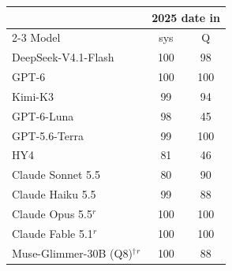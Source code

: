 \begin{tabular}{@{}l cc@{}}
\toprule
 & \multicolumn{2}{c}{2025 date in} \\
\cmidrule(lr){2-3}
Model & sys & Q \\
\midrule
DeepSeek-V4.1-Flash & 100 & 98 \\
GPT-6 & 100 & 100 \\
Kimi-K3 & 99 & 94 \\
GPT-6-Luna & 98 & 45 \\
GPT-5.6-Terra & 99 & 100 \\
HY4 & 81 & 46 \\
Claude Sonnet 5.5 & 80 & 90 \\
Claude Haiku 5.5 & 99 & 88 \\
Claude Opus 5.5$^{r}$ & 100 & 100 \\
Claude Fable 5.1$^{r}$ & 100 & 100 \\
Muse-Glimmer-30B (Q8)$^\dagger$$^{r}$ & 100 & 88 \\
\bottomrule
\end{tabular}
